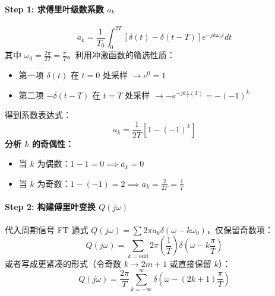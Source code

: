 \paragraph{Step 1: 求傅里叶级数系数 $a_k$}
\[ a_k = \frac{1}{T_0} \int_{0}^{2T} [\delta(t) - \delta(t-T)] e^{-jk\omega_0 t} dt \]
其中 $\omega_0 = \frac{2\pi}{2T} = \frac{\pi}{T}$。利用冲激函数的筛选性质：
\begin{itemize}
    \item 第一项 $\delta(t)$ 在 $t=0$ 处采样 $\rightarrow e^0 = 1$
    \item 第二项 $-\delta(t-T)$ 在 $t=T$ 处采样 $\rightarrow -e^{-jk\frac{\pi}{T}(T)} = -(-1)^k$
\end{itemize}
得到系数表达式：
\[ a_k = \frac{1}{2T} [1 - (-1)^k] \]
\textbf{分析 $k$ 的奇偶性：}
\begin{itemize}
    \item 当 $k$ 为偶数：$1 - 1 = 0 \implies a_k = 0$
    \item 当 $k$ 为奇数：$1 - (-1) = 
2 \implies a_k = \frac{2}{2T} = \frac{1}{T}$
\end{itemize}

\paragraph{Step 2: 构建傅里叶变换 $Q(j\omega)$}
代入周期信号 FT 通式 $Q(j\omega) = \sum 2\pi a_k \delta(\omega - k\omega_0)$，仅保留奇数项：
\[ Q(j\omega) = \sum_{k=\text{odd}} 2\pi \left( \frac{1}{T} \right) \delta\left(\omega - k\frac{\pi}{T}\right) \]
或者写成更紧凑的形式（令奇数 $k \rightarrow 2m+1$ 或直接保留 $k$）：
\[ Q(j\omega) = \frac{2\pi}{T} \sum_{k=-\infty}^{\infty} \delta\left(\omega - (2k+1)\frac{\pi}{T}\right) \]